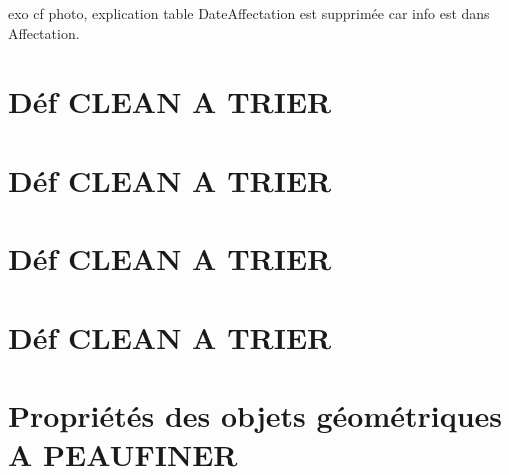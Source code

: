 \documentclass[12pt,a4paper]{article}
\begin{document}
{exo
cf photo, explication table DateAffectation est supprimée car info est dans Affectation.





\section{Déf CLEAN A TRIER }
\section{Déf CLEAN A TRIER }
\section{Déf CLEAN A TRIER }
\section{Déf CLEAN A TRIER }




\section{Propriétés des objets géométriques A PEAUFINER}







}
\end{document}
